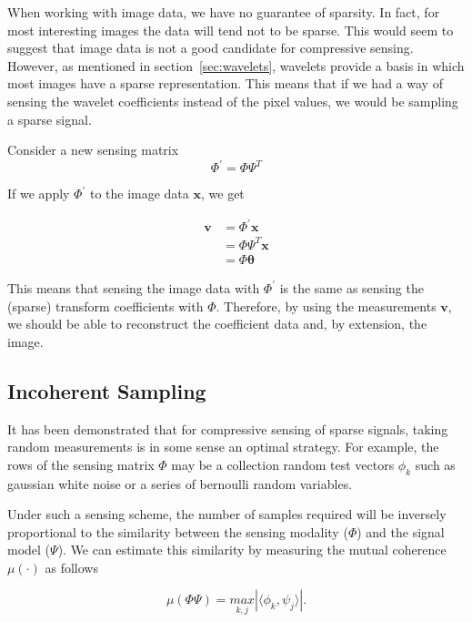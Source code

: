 \documentclass{IEEEtran}
\newcommand{\bfv}{\mathbf{v}}
\newcommand{\bfx}{\mathbf{x}}
\newcommand{\bftheta}{\mathbf{\theta}}
\begin{document}
When working with image data, we have no guarantee of sparsity. In fact, for most interesting images the data will tend not to be sparse. This would seem to suggest that image data is not a good candidate for compressive sensing. However, as mentioned in section~\ref{sec:wavelets}, wavelets provide a basis in which most images have a sparse representation.  This means that if we had a way of sensing the wavelet coefficients instead of the pixel values, we would be sampling a sparse signal.

Consider a new sensing matrix
\begin{equation}
  \label{eq:newsense}
  \Phi^\prime = \Phi \Psi^T
\end{equation}

If we apply $\Phi^\prime$ to the image data $\bfx$, we get

\begin{equation}
  \label{eq:newsenseapplied}
  \begin{split}
  \bfv &= \Phi^\prime \bfx \\
  &= \Phi \Psi^T \bfx \\
  &= \Phi \bftheta
  \end{split}
\end{equation}

This means that sensing the image data with $\Phi^\prime$ is the same as sensing the (sparse) transform coefficients with $\Phi$.  Therefore, by using the measurements $\bfv$, we should be able to reconstruct the coefficient data and, by extension, the image.

\subsection{Incoherent Sampling}
\label{sub:incoherence}

It has been demonstrated \cite{Candes06b,Baraniuk06} that for compressive sensing of sparse signals, taking random measurements is in some sense an optimal strategy. For example, the rows of the sensing matrix $\Phi$ may be a collection random test vectors ${\phi_k}$ such as gaussian white noise or a series of bernoulli random variables.

Under such a sensing scheme, the number of samples required will be inversely proportional to the similarity between the sensing modality ($\Phi$) and the signal model ($\Psi$).  We can estimate this similarity by measuring the mutual coherence $\mu(\cdot)$ as follows \cite{Donoho01,Candes06}

\begin{equation}
  \label{eq:coherence}
  \mu(\Phi \Psi) = \underset{k,j}{max}| \langle \phi_k, \psi_j \rangle | .
\end{equation}
\end{document}
